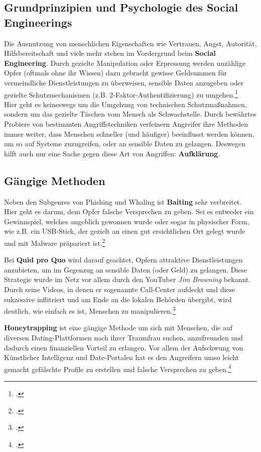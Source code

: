 \documentclass[12pt, a4paper, oneside]{scrartcl}
\begin{document}
\subsection{Grundprinzipien und Psychologie des Social Engineerings}
Die Ausnutzung von menschlichen Eigenschaften wie Vertrauen, Angst, Autorität, Hilfsbereitschaft 
und viele mehr stehen im Vordergrund beim \textbf{Social Engineering}. Durch gezielte Manipulation
oder Erpressung werden unzählige Opfer (oftmals ohne ihr Wissen) dazu gebracht gewisse Geldsummen
für vermeindliche Dienstleistungen zu überweisen, sensible Daten anzugeben oder gezielte Schutzmechanismen
(z.B. 2-Faktor-Authentifizierung) zu umgehen.\footcite{BSISocialEngineering}\\
Hier geht es keineswegs um die Umgehung von technischen Schutzmaßnahmen, sondern um das gezielte
Täschen vom Mensch als Schwachstelle. Durch bewährtes Probiere von bestimmten Angriffstechniken
verfeinern Angreifer ihre Methoden immer weiter, dass Menschen schneller (und häufiger) beeinflusst
werden können, um so auf Systeme zuzugreifen, oder an sensible Daten zu gelangen.
Deswegen hilft auch nur eine Sache gegen diese Art von Angriffen: \textbf{Aufklärung}.\\

\subsection{Gängige Methoden}
Neben den Subgenres von Phishing und Whaling ist \textbf{Baiting} sehr verbreitet.
Hier geht es darum, dem Opfer falsche Versprechen zu geben. Sei es entweder ein Gewinnspiel,
welches angeblich gewonnen wurde oder sogar in physischer Form, wie z.B. ein USB-Stick,
der gezielt an einen gut ersichtlichen Ort gelegt wurde und mit Malware präpariert ist.\footcite{CS_10Arten}
\par
Bei \textbf{Quid pro Quo} wird darauf geachtet, Opfern attraktive Dienstleistungen anzubieten, um im Gegenzug
an sensible Daten (oder Geld) zu gelangen. Diese Strategie wurde im Netz vor allem durch den YouTuber \textit{Jim Browning} bekannt.
Durch seine Videos, in denen er sogenannte Call-Center aufdeckt und diese sukzessive inflitriert und
am Ende an die lokalen Behörden übergibt, wird deutlich, wie einfach es ist, Menschen zu manipulieren.\footcite{JB_YouTube}
\par
\textbf{Honeytrapping} ist eine gängige Methode um sich mit Menschen, die auf diversen Dating-Plattformen nach
ihrer Traumfrau suchen, anzufreunden und dadurch einen finanziellen Vorteil zu erlangen. Vor allem 
der Aufschwung von Künstlicher Intelligenz und Date-Portalen hat es den Angreifern umso leicht gemacht
gefälschte Profile zu erstellen und falsche Versprechen zu geben.\footcite{CS_10Arten}
\end{document}
